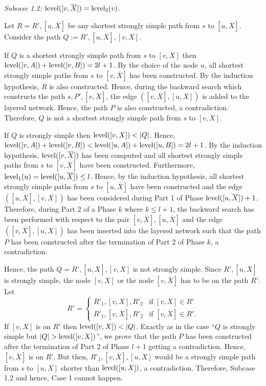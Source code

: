 \documentclass[12pt,twoside,a4paper]{article}
\def\lev{{\rm level}}
\begin{document}
\medskip
\noindent
{\em Subcase 1.2:} $\lev([v,\overline{X}]) = \lev_2(v)$.

\medskip
Let $R = R',[u,\overline{X}]$ be any shortest strongly simple path from $s$ to 
$[u,\overline{X}]$. Consider the path $Q := R',[u,\overline{X}],[v,X]$. 

If $Q$ is a shortest strongly simple path from $s$ to $[v,X]$ then 
$\lev([v,A]) + \lev([v,B]) = 2l+1$. 
By the choice of the node $u$, all shortest strongly simple paths from $s$ to 
$[v,\overline{X}]$ has been constructed. By the induction hypothesis, $R$ is also constructed. 
Hence, during the backward search which constructs the path $s,P',[v,\overline{X}]$,
the edge $([v,\overline{X}],[u,X])$ is added to the layered network. Hence, the path
$P$ is also constructed, a contradiction.
Therefore, $Q$ is not a shortest strongly simple path from $s$ to $[v,X]$. 

If $Q$ is strongly simple
then $\lev([v,X]) < |Q|$. Hence, $\lev([v,A]) + \lev([v,B]) < \lev([u,A]) + \lev([u,B]) = 2l+1$. 
By the induction hypothesis, $\lev([v,\overline{X}])$ has been computed and all shortest strongly 
simple paths from $s$ to $[v,\overline{X}]$ have been constructed. Furthermore, 
$\lev_1(u) = \lev([u,\overline{X}]) \leq l$. Hence, by the induction hypothesis, all shortest 
strongly simple paths from $s$ to $[u,\overline{X}]$ have been constructed and the edge 
$([u,\overline{X}],[v,X])$ has been considered during Part 1 of Phase
$\lev([u,\overline{X}]) + 1$. 
Therefore, during Part 2 of a Phase $k$ where $k \leq l+1$, the backward search has been performed
with respect to the pair $[v,\overline{X}],[u,\overline{X}]$ and the edge 
$([v,\overline{X}],[u,X])$ has been inserted into the layered network such that the path $P$
has been constructed after the termination of Part 2 of Phase $k$, a contradiction.

Hence, the path $Q = R',[u,\overline{X}],[v,X]$ is not strongly simple. Since $R',[u,\overline{X}]$
is strongly simple, the node $[v,X]$ or the node $[v,\overline{X}]$ has to be on the path $R'$. Let
$$
R' = \left\{ \begin{array}{ll}
               R'_1,[v,X],R'_2 & \mbox{if $[v,X] \in R'$} \\
               R'_1,[v,\overline{X}],R'_2 & \mbox{if $[v,\overline{X}] \in R'$.} 
              \end{array} \right.
$$
If $[v,X]$ is on $R'$ then $\lev([v,X]) < |Q|$. Exactly as in the case ``$Q$ is strongly simple but
$|Q| > \lev([v,X])$'', we prove that the path $P$ has been constructed after the termination of 
Part 2 of Phase $l+1$ getting a contradiction. Hence, $[v,\overline{X}]$ is on $R'$. But then, 
$R'_1,[v,\overline{X}],[u,X]$ would be a strongly simple path from $s$ to $[u,X]$ shorter than 
$\lev([u,X])$, a contradiction. Therefore, Subcase 1.2 and hence, Case 1 cannot happen.
\end{document}
